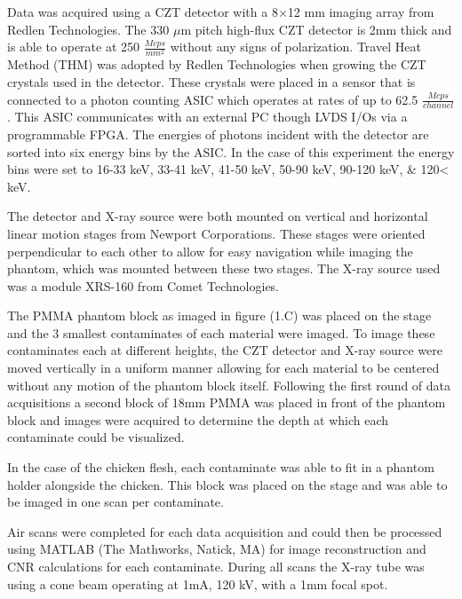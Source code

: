 \documentclass[journal, a4paper]{IEEEtran}
\begin{document}
Data was acquired using a CZT detector with a 8$\times$12 mm imaging array from Redlen Technologies. The 330 $\mu$m pitch high-flux CZT detector is 2mm thick and is able to operate at 250 $\frac{Mcps}{mm^2}$ without any signs of polarization. Travel Heat Method (THM) was adopted by Redlen Technologies when growing the CZT crystals used in the detector. These crystals were placed in a sensor that is connected to a photon counting ASIC which operates at rates of up to 62.5 $\frac{Mcps}{channel}$. This ASIC communicates with an external PC though LVDS I/Os via a programmable FPGA. The energies of photons incident with the detector are sorted into six energy bins by the ASIC. In the case of this experiment the energy bins were set to 16-33 keV, 33-41 keV, 41-50 keV, 50-90 keV, 90-120 keV, \& 120< keV.

The detector and X-ray source were both mounted on vertical and horizontal linear motion stages from Newport Corporations. These stages were oriented perpendicular to each other to allow for easy navigation while imaging the phantom, which was mounted between these two stages. The X-ray source used was a module XRS-160 from Comet Technologies. 

The PMMA phantom block as imaged in figure (1.C) was placed on the stage and the 3 smallest contaminates of each material were imaged. To image these contaminates each at different heights, the CZT detector and X-ray source were moved vertically in a uniform manner allowing for each material to be centered without any motion of the phantom block itself. Following the first round of data acquisitions a second block of 18mm PMMA was placed in front of the phantom block and images were acquired to determine the depth at which each contaminate could be visualized. 

In the case of the chicken flesh, each contaminate was able to fit in a phantom holder alongside the chicken. This block was placed on the stage and was able to be imaged in one scan per contaminate. 

Air scans were completed for each data acquisition and could then be processed using MATLAB (The Mathworks, Natick, MA) for image reconstruction and CNR calculations for each contaminate. During all scans the X-ray tube was using a cone beam operating at 1mA, 120 kV, with a 1mm focal spot. 


\end{document}
